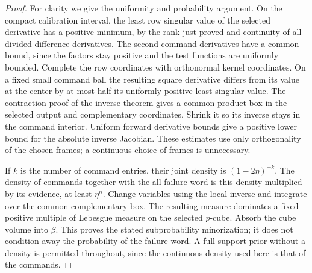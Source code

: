\begin{proof}
For clarity we give the uniformity and probability argument. On the
compact calibration interval, the least row singular value of the
selected derivative has a positive minimum, by the rank just proved
and continuity of all divided-difference derivatives. The second command
derivatives have a common bound, since the factors stay positive and
the test functions are uniformly bounded. Complete the row coordinates
with orthonormal kernel coordinates. On a fixed small command ball the
resulting square derivative differs from its value at the center by at
most half its uniformly positive least singular value. The contraction
proof of the inverse theorem gives a common product box in the selected
output and complementary coordinates. Shrink it so its inverse stays
in the command interior. Uniform forward derivative bounds give a
positive lower bound for the absolute inverse Jacobian. These estimates
use only orthogonality of the chosen frames; a continuous choice of
frames is unnecessary.

If $k$ is the number of command entries, their joint density is
$(1-2\eta)^{-k}$. The density of commands together with the all-failure
word is this density multiplied by its evidence, at least $\eta^n$.
Change variables using the local inverse and integrate over the common
complementary box. The resulting measure dominates a fixed positive
multiple of Lebesgue measure on the selected $p$-cube. Absorb the cube
volume into $\beta$. This proves the stated subprobability minorization;
it does not condition away the probability of the failure word. A
full-support prior without a density is permitted throughout, since the
continuous density used here is that of the commands.
\end{proof}

